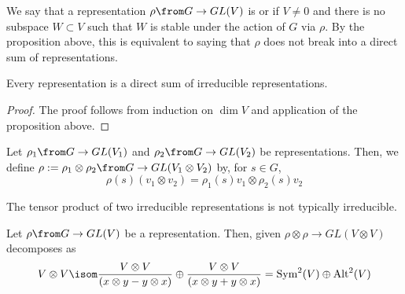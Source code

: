 \documentclass[11pt,leqno,oneside]{amsbook}
\numberwithin{thm}{section}
\begin{document}
\begin{defn}
  We say that a representation \(\rho \from G \to GL(V)\) is
   or  if \(V \neq 0\) and there is no
  subspace \(W
  \subset V\) such that \(W\) is stable under the action of \(G\) via
  \(\rho\). By the proposition above, this is equivalent to saying
  that \(\rho\) does not break into a direct sum of representations.
\end{defn}
\begin{prop}
  Every representation is a direct sum of irreducible representations.
\end{prop}
\begin{proof}
  The proof follows from induction on \(\dim V\) and application of
  the proposition above.
\end{proof}
\begin{defn}
  Let \(\rho_1 \from G \to GL(V_1)\) and \(\rho_2 \from G \to
  GL(V_2)\) be representations. Then, we define \(\rho := \rho_1
  \otimes \rho_2 \from G \to GL(V_1 \otimes V_2)\) by, for \(s \in G\), \[
    \rho(s)(v_1 \otimes v_2) = \rho_1(s)v_1 \otimes \rho_2(s) v_2
  \]
\end{defn}
\begin{rmk}
  The tensor product of two irreducible representations is not
  typically irreducible. 
\end{rmk}
\begin{thm}
  Let \(\rho \from G \to GL(V)\) be a representation. Then, given
  \(\rho \otimes \rho \to GL(V \otimes V)\) decomposes as \[
    V \otimes V \isom \frac{V \otimes V}{(x \otimes y - y \otimes x)} \oplus
    \frac{V \otimes V}{(x \otimes y + y \otimes x)} =
    \operatorname{Sym}^2(V) \oplus \operatorname{Alt}^2(V)
  \]
\end{thm}
\end{document}
